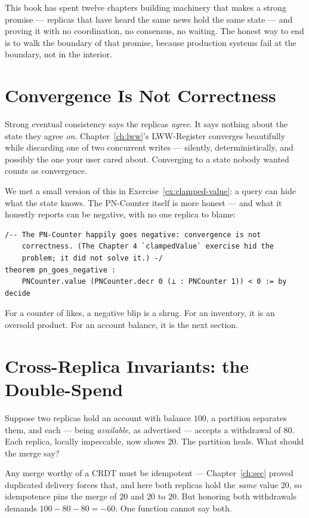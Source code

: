 \documentclass[12pt, a4paper, openright]{book}
\theoremstyle{thmstyle}
\theoremstyle{defstyle}
\newcounter{exercise}[chapter]
\begin{document}
This book has spent twelve chapters building machinery that makes a
strong promise --- replicas that have heard the same news hold the same
state --- and proving it with no coordination, no consensus, no waiting.
The honest way to end is to walk the boundary of that promise, because
production systems fail at the boundary, not in the interior.

\section{Convergence Is Not Correctness}

Strong eventual consistency says the replicas \emph{agree}. It says
nothing about the state they agree \emph{on}. Chapter~\ref{ch:lww}'s
LWW-Register converges beautifully while discarding one of two
concurrent writes --- silently, deterministically, and possibly the one
your user cared about. Converging to a state nobody wanted counts as
convergence.

We met a small version of this in
Exercise~\ref{ex:clamped-value}: a query can hide what the state knows.
The PN-Counter itself is more honest --- and what it honestly reports
can be negative, with no one replica to blame:

\begin{verbatim}
/-- The PN-Counter happily goes negative: convergence is not
    correctness. (The Chapter 4 `clampedValue` exercise hid the
    problem; it did not solve it.) -/
theorem pn_goes_negative :
    PNCounter.value (PNCounter.decr 0 (⊥ : PNCounter 1)) < 0 := by decide
\end{verbatim}

For a counter of likes, a negative blip is a shrug. For an inventory, it
is an oversold product. For an account balance, it is the next section.

\section{Cross-Replica Invariants: the Double-Spend}

Suppose two replicas hold an account with balance $100$, a partition
separates them, and each --- being \emph{available}, as advertised ---
accepts a withdrawal of $80$. Each replica, locally impeccable, now
shows $20$. The partition heals. What should the merge say?

Any merge worthy of a CRDT must be idempotent --- Chapter~\ref{ch:sec}
proved duplicated delivery forces that, and here both replicas hold the
\emph{same} value $20$, so idempotence pins the merge of $20$ and $20$
to $20$. But honoring both withdrawals demands $100 - 80 - 80 = -60$.
One function cannot say both.
\end{document}
